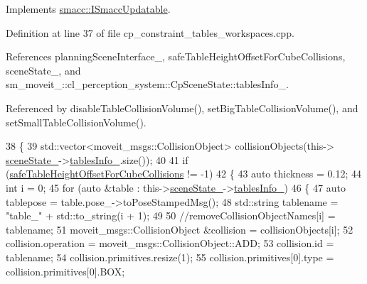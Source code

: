 Implements \hyperlink{classsmacc_1_1ISmaccUpdatable_a84ee0520cbefdb1d412bed54650b028e}{smacc\+::\+I\+Smacc\+Updatable}.



Definition at line 37 of file cp\+\_\+constraint\+\_\+tables\+\_\+workspaces.\+cpp.



References planning\+Scene\+Interface\+\_\+, safe\+Table\+Height\+Offset\+For\+Cube\+Collisions, scene\+State\+\_\+, and sm\+\_\+moveit\+\_\+::cl\+\_\+perception\+\_\+system\+::\+Cp\+Scene\+State\+::tables\+Info\+\_\+.



Referenced by disable\+Table\+Collision\+Volume(), set\+Big\+Table\+Collision\+Volume(), and set\+Small\+Table\+Collision\+Volume().


\begin{DoxyCode}
38         \{
39             std::vector<moveit\_msgs::CollisionObject> collisionObjects(this->
      \hyperlink{classsm__moveit__4_1_1move__group__interface__client_1_1CpConstraintTableWorkspaces_aee8b5f525a640819e13271dc68f5d4e2}{sceneState\_}->\hyperlink{classsm__moveit__4_1_1cl__perception__system_1_1CpSceneState_a95f74dd16566d97e017650ccdf4b8a46}{tablesInfo\_}.size());
40 
41             \textcolor{keywordflow}{if} (\hyperlink{classsm__moveit__4_1_1move__group__interface__client_1_1CpConstraintTableWorkspaces_a3f9ba91578890ba9a146c678e3630d9f}{safeTableHeightOffsetForCubeCollisions} != -1)
42             \{
43                 \textcolor{keyword}{auto} thickness = 0.12;
44                 \textcolor{keywordtype}{int} i = 0;
45                 \textcolor{keywordflow}{for} (\textcolor{keyword}{auto} &table : this->\hyperlink{classsm__moveit__4_1_1move__group__interface__client_1_1CpConstraintTableWorkspaces_aee8b5f525a640819e13271dc68f5d4e2}{sceneState\_}->\hyperlink{classsm__moveit__4_1_1cl__perception__system_1_1CpSceneState_a95f74dd16566d97e017650ccdf4b8a46}{tablesInfo\_})
46                 \{
47                     \textcolor{keyword}{auto} tablepose = table.pose\_->toPoseStampedMsg();
48                     std::string tablename = \textcolor{stringliteral}{"table\_"} + std::to\_string(i + 1);
49 
50                     \textcolor{comment}{//removeCollisionObjectNames[i] = tablename;}
51                     moveit\_msgs::CollisionObject &collision = collisionObjects[i];
52                     collision.operation = moveit\_msgs::CollisionObject::ADD;
53                     collision.id = tablename;
54                     collision.primitives.resize(1);
55                     collision.primitives[0].type = collision.primitives[0].BOX;

\end{DoxyCode}
